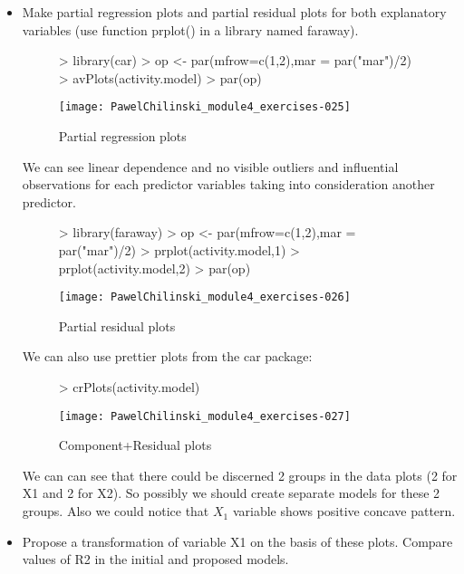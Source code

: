 \documentclass[a4paper]{article}
\begin{document}
\begin{itemize}
\item Make partial regression plots and partial residual plots for both
explanatory variables (use function prplot() in a library named faraway).
\begin{figure}[H]
\begin{center}
\begin{Schunk}
\begin{Sinput}
> library(car)
> op <- par(mfrow=c(1,2),mar = par("mar")/2)
> avPlots(activity.model)
> par(op)
\end{Sinput}
\end{Schunk}
\texttt{[image: PawelChilinski\_module4\_exercises-025]}
\caption{Partial regression plots}
\end{center}
\end{figure}
We can see linear dependence and no visible outliers and influential
observations for each predictor variables taking into consideration another
predictor. 
\begin{figure}[H]
\begin{center}
\begin{Schunk}
\begin{Sinput}
> library(faraway)
> op <- par(mfrow=c(1,2),mar = par("mar")/2)
> prplot(activity.model,1)
> prplot(activity.model,2)
> par(op)
\end{Sinput}
\end{Schunk}
\texttt{[image: PawelChilinski\_module4\_exercises-026]}
\caption{Partial residual plots}
\end{center}
\end{figure}
We can also use prettier plots from the car package:
\begin{figure}[H]
\begin{center}
\begin{Schunk}
\begin{Sinput}
> crPlots(activity.model)
\end{Sinput}
\end{Schunk}
\texttt{[image: PawelChilinski\_module4\_exercises-027]}
\caption{Component+Residual plots}
\end{center}
\end{figure}
We can can see that there could be discerned 2 groups in the data plots (2 for
X1 and 2 for X2). So possibly we should create separate models for these 2
groups. Also we could notice that $X_1$ variable shows positive concave pattern. 
\item Propose a transformation of variable X1 on the basis of these plots.
Compare values of R2 in the initial and proposed models.

\end{itemize}
\end{document}
